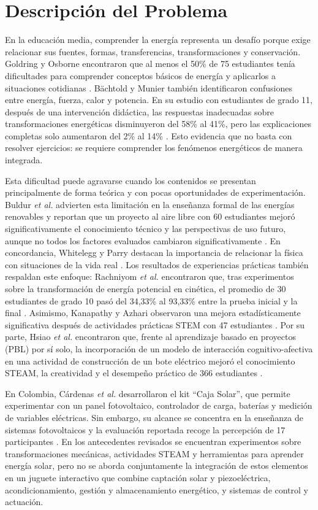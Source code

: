\documentclass[11pt]{article}
\begin{document}
\section{Descripción del Problema}
En la educación media, comprender la energía representa un desafío porque exige relacionar sus fuentes, formas, transferencias, transformaciones y conservación. Goldring y Osborne encontraron que al menos el 50\% de 75 estudiantes tenía dificultades para comprender conceptos básicos de energía y aplicarlos a situaciones cotidianas \cite{goldring1994}. Bächtold y Munier también identificaron confusiones entre energía, fuerza, calor y potencia. En su estudio con estudiantes de grado 11, después de una intervención didáctica, las respuestas inadecuadas sobre transformaciones energéticas disminuyeron del 58\% al 41\%, pero las explicaciones completas solo aumentaron del 2\% al 14\% \cite{bachtold2019}. Esto evidencia que no basta con resolver ejercicios: se requiere comprender los fenómenos energéticos de manera integrada.

Esta dificultad puede agravarse cuando los contenidos se presentan principalmente de forma teórica y con pocas oportunidades de experimentación. Buldur \textit{et al.} advierten esta limitación en la enseñanza formal de las energías renovables y reportan que un proyecto al aire libre con 60 estudiantes mejoró significativamente el conocimiento técnico y las perspectivas de uso futuro, aunque no todos los factores evaluados cambiaron significativamente \cite{buldur2020}. En concordancia, Whitelegg y Parry destacan la importancia de relacionar la física con situaciones de la vida real \cite{whitelegg1999}. Los resultados de experiencias prácticas también respaldan este enfoque: Rachniyom \textit{et al.} encontraron que, tras experimentos sobre la transformación de energía potencial en cinética, el promedio de 30 estudiantes de grado 10 pasó del 34,33\% al 93,33\% entre la prueba inicial y la final \cite{rachniyom2017}. Asimismo, Kanapathy y Azhari observaron una mejora estadísticamente significativa después de actividades prácticas STEM con 47 estudiantes \cite{kanapathy2024}. Por su parte, Hsiao \textit{et al.} encontraron que, frente al aprendizaje basado en proyectos (PBL) por sí solo, la incorporación de un modelo de interacción cognitivo-afectiva en una actividad de construcción de un bote eléctrico mejoró el conocimiento STEAM, la creatividad y el desempeño práctico de 366 estudiantes \cite{hsiao2022}.

En Colombia, Cárdenas \textit{et al.} desarrollaron el kit ``Caja Solar'', que permite experimentar con un panel fotovoltaico, controlador de carga, baterías y medición de variables eléctricas. Sin embargo, su alcance se concentra en la enseñanza de sistemas fotovoltaicos y la evaluación reportada recoge la percepción de 17 participantes \cite{cardenas2024}. En los antecedentes revisados se encuentran experimentos sobre transformaciones mecánicas, actividades STEAM y herramientas para aprender energía solar, pero no se aborda conjuntamente la integración de estos elementos en un juguete interactivo que combine captación solar y piezoeléctrica, acondicionamiento, gestión y almacenamiento energético, y sistemas de control y actuación.
\end{document}
